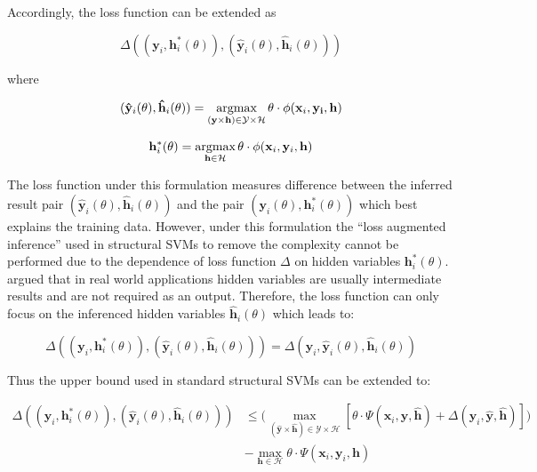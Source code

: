 Accordingly, the loss function can be extended as

$$
\Delta((\mathbf{y}_i,\mathbf{h}^*_i(\theta)),(\mathbf{\hat{y}}_i(\theta),\mathbf{\hat{h}}_i(\theta)))
$$

\noindent where

\begin{align}
  \label{eq:latentssvm_full_inf}
 (\mathbf{\hat{y}}_i(\theta),\mathbf{\hat{h}}_i(\theta))=\mathop{\textrm{argmax}}_{(\mathbf{y}
  \times \mathbf{h}) \in \mathcal{Y} \times \mathcal{H}}
\theta\cdot\phi(\mathbf{x}_i,\mathbf{y_i},\mathbf{h})
\end{align}

\begin{align}
  \label{eq:latentssvm_latent_inf}
  \mathbf{h}^*_i(\theta) = \mathop{\textrm{argmax}}_{\mathbf{h} \in \mathcal{H}} \theta \cdot
  \phi(\mathbf{x}_i,\mathbf{y}_i,\mathbf{h})
\end{align}

The loss function under this formulation measures difference
between the inferred result pair $(\mathbf{\hat{y}}_i(\theta),
\mathbf{\hat{h}}_i(\theta))$ and the pair $(\mathbf{y}_i(\theta),
\mathbf{h}_i^*(\theta))$ which best explains the training data.
However, under this formulation the ``loss augmented inference''
used in structural SVMs\cite{tsochantaridis2005large} to remove
the complexity cannot be performed due to the dependence of loss
function $\Delta$ on hidden variables $\mathbf{h}^*_i(\theta)$.
 argued that in real world applications
hidden variables are usually intermediate results and are not
required as an output\cite{yu2009learning}. Therefore, the loss
function can only focus on the inferenced hidden variables
$\mathbf{\hat{h}}_i(\theta)$ which leads to:

$$
\Delta((\mathbf{y}_i,\mathbf{h}^*_i(\theta)),(\mathbf{\hat{y}}_i(\theta),\mathbf{\hat{h}}_i(\theta)))
=
\Delta(\mathbf{y}_i,\mathbf{\hat{y}}_i(\theta),\mathbf{\hat{h}}_i(\theta))
$$

Thus the upper bound used in standard structural
SVMs\cite{tsochantaridis2005large} can be extended to:

\begin{align}
  \Delta((\mathbf{y}_i,\mathbf{h}^*_i(\theta)),(\mathbf{\hat{y}}_i(\theta),\mathbf{\hat{h}}_i(\theta)))
  &\leq \bigg(\max_{(\mathbf{\hat{y}} \times \mathbf{\hat{h}}) \in
    \mathcal{Y} \times \mathcal{H}}
    [\theta\cdot\Psi(\mathbf{x}_i,\mathbf{\hat{y}},\mathbf{\hat{h}}) +
    \Delta(\mathbf{y}_i,\mathbf{\hat{y}},\mathbf{\hat{h}})]\bigg)\\
  &-\max_{\mathbf{h} \in \mathcal{H}} \theta \cdot
    \Psi(\mathbf{x}_i,\mathbf{y}_i,\mathbf{h})
\end{align}

